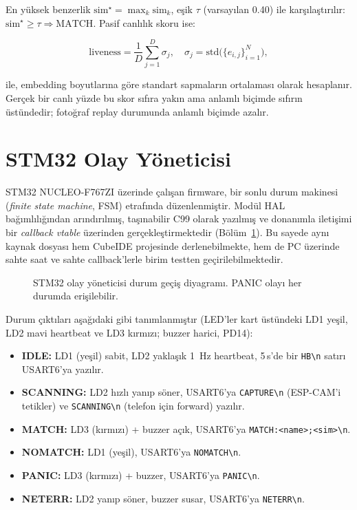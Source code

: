 En yüksek benzerlik $\mathrm{sim}^\star = \max_k \mathrm{sim}_k$, eşik
$\tau$ (varsayılan 0.40) ile karşılaştırılır:
$\mathrm{sim}^\star \geq \tau \Rightarrow \text{MATCH}$. Pasif canlılık
skoru ise:

\begin{equation}
\mathrm{liveness} = \frac{1}{D}\sum_{j=1}^{D} \sigma_j, \quad
\sigma_j = \mathrm{std}\bigl(\{e_{i,j}\}_{i=1}^{N}\bigr),
\end{equation}

ile, embedding boyutlarına göre standart sapmaların ortalaması olarak
hesaplanır. Gerçek bir canlı yüzde bu skor sıfıra yakın ama anlamlı
biçimde sıfırın üstündedir; fotoğraf replay durumunda anlamlı biçimde
azalır.

\section{STM32 Olay Yöneticisi}
\label{sec:stm-olay-yonetimi}

STM32 NUCLEO-F767ZI üzerinde çalışan firmware, bir sonlu durum makinesi
(\emph{finite state machine}, FSM) etrafında düzenlenmiştir.
Modül HAL bağımlılığından arındırılmış, taşınabilir C99 olarak yazılmış
ve donanımla iletişimi bir \emph{callback vtable} üzerinden
gerçekleştirmektedir (Bölüm~\ref{fig:fsm}). Bu sayede aynı kaynak dosyası
hem CubeIDE projesinde derlenebilmekte, hem de PC üzerinde sahte saat
ve sahte callback'lerle birim testten geçirilebilmektedir.

\begin{figure}[h!]
\centering
{}
\caption{STM32 olay yöneticisi durum geçiş diyagramı. PANIC olayı her durumda erişilebilir.}
\label{fig:fsm}
\end{figure}

Durum çıktıları aşağıdaki gibi tanımlanmıştır (LED'ler kart üstündeki
LD1 yeşil, LD2 mavi heartbeat ve LD3 kırmızı; buzzer harici, PD14):

\begin{itemize}
    \item \textbf{IDLE:} LD1 (yeşil) sabit, LD2 yaklaşık 1~Hz heartbeat,
          5\,s'de bir \texttt{HB\textbackslash n} satırı USART6'ya yazılır.
    \item \textbf{SCANNING:} LD2 hızlı yanıp söner, USART6'ya
          \texttt{CAPTURE\textbackslash n} (ESP-CAM'i tetikler) ve
          \texttt{SCANNING\textbackslash n} (telefon için forward) yazılır.
    \item \textbf{MATCH:} LD3 (kırmızı) + buzzer açık,
          USART6'ya \texttt{MATCH:<name>;<sim>\textbackslash n}.
    \item \textbf{NOMATCH:} LD1 (yeşil), USART6'ya \texttt{NOMATCH\textbackslash n}.
    \item \textbf{PANIC:} LD3 (kırmızı) + buzzer, USART6'ya
          \texttt{PANIC\textbackslash n}.
    \item \textbf{NETERR:} LD2 yanıp söner, buzzer susar, USART6'ya
          \texttt{NETERR\textbackslash n}.
\end{itemize}

